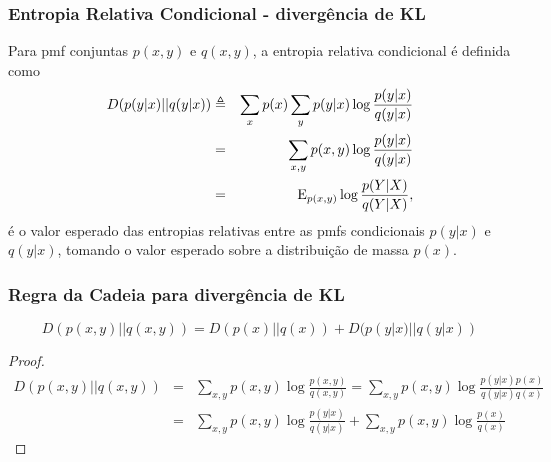 \begin{frame}%
  \frametitle{Entropia Relativa Condicional - divergência de KL}
  \begin{definition}
  Para pmf conjuntas $p(x,y)$ e $q(x,y)$, a entropia relativa condicional é definida como
  \begin{eqnarray}
        D(p(y|x) || q(y|x)) &\triangleq& \sum_x p(x) \sum_y p(y|x) \log \frac{p(y|x)}{q(y|x)} \nonumber \\
                &=& \sum_{x,y} p(x,y) \log \frac{p(y|x)}{q(y|x)} \nonumber \\
                &=& \mathrm{E}_{p(x,y)} \log \frac{p(Y|X)}{q(Y|X)} ,
  \end{eqnarray}
  é o valor esperado das entropias relativas entre as pmfs condicionais $p(y|x)$ e $q(y|x)$, 
  tomando o valor esperado sobre a distribuição de massa $p(x)$.
  \end{definition} 
\end{frame}


\begin{frame}%
  \frametitle{Regra da Cadeia para divergência de KL}
  \begin{proposition}
  \begin{equation}
  D(p(x,y)||q(x,y)) = D(p(x)||q(x)) + D(p(y|x)||q(y|x))
  \end{equation}
  \end{proposition}

  \begin{proof}
  \begin{eqnarray}
  D(p(x,y)||q(x,y)) &=& \sum_{x,y} p(x,y) \log \frac{p(x,y)}{q(x,y)} = \sum_{x,y} p(x,y) \log \frac{ p(y|x)p(x) }{ q(y|x)q(x) } \nonumber \\
        &=& \sum_{x,y} p(x,y) \log \frac{ p(y|x) }{ q(y|x) } + \sum_{x,y} p(x,y) \log \frac{ p(x) }{ q(x) } 
  \end{eqnarray}
  \end{proof}
\end{frame}



